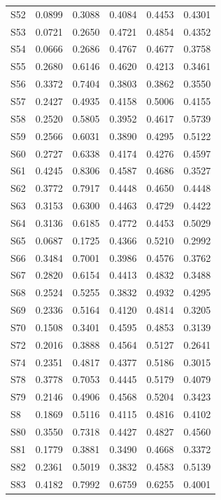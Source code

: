 \begin{longtable}{lrrrrr}
  S52 & 0.0899 & 0.3088 & 0.4084 & 0.4453 & 0.4301 \\
  S53 & 0.0721 & 0.2650 & 0.4721 & 0.4854 & 0.4352 \\
  S54 & 0.0666 & 0.2686 & 0.4767 & 0.4677 & 0.3758 \\
  S55 & 0.2680 & 0.6146 & 0.4620 & 0.4213 & 0.3461 \\
  S56 & 0.3372 & 0.7404 & 0.3803 & 0.3862 & 0.3550 \\
  S57 & 0.2427 & 0.4935 & 0.4158 & 0.5006 & 0.4155 \\
  S58 & 0.2520 & 0.5805 & 0.3952 & 0.4617 & 0.5739 \\
  S59 & 0.2566 & 0.6031 & 0.3890 & 0.4295 & 0.5122 \\
  S60 & 0.2727 & 0.6338 & 0.4174 & 0.4276 & 0.4597 \\
  S61 & 0.4245 & 0.8306 & 0.4587 & 0.4686 & 0.3527 \\
  S62 & 0.3772 & 0.7917 & 0.4448 & 0.4650 & 0.4448 \\
  S63 & 0.3153 & 0.6300 & 0.4463 & 0.4729 & 0.4422 \\
  S64 & 0.3136 & 0.6185 & 0.4772 & 0.4453 & 0.5029 \\
  S65 & 0.0687 & 0.1725 & 0.4366 & 0.5210 & 0.2992 \\
  S66 & 0.3484 & 0.7001 & 0.3986 & 0.4576 & 0.3762 \\
  S67 & 0.2820 & 0.6154 & 0.4413 & 0.4832 & 0.3488 \\
  S68 & 0.2524 & 0.5255 & 0.3832 & 0.4932 & 0.4295 \\
  S69 & 0.2336 & 0.5164 & 0.4120 & 0.4814 & 0.3205 \\
  S70 & 0.1508 & 0.3401 & 0.4595 & 0.4853 & 0.3139 \\
  S72 & 0.2016 & 0.3888 & 0.4564 & 0.5127 & 0.2641 \\
  S74 & 0.2351 & 0.4817 & 0.4377 & 0.5186 & 0.3015 \\
  S78 & 0.3778 & 0.7053 & 0.4445 & 0.5179 & 0.4079 \\
  S79 & 0.2146 & 0.4906 & 0.4568 & 0.5204 & 0.3423 \\
  S8 & 0.1869 & 0.5116 & 0.4115 & 0.4816 & 0.4102 \\
  S80 & 0.3550 & 0.7318 & 0.4427 & 0.4827 & 0.4560 \\
  S81 & 0.1779 & 0.3881 & 0.3490 & 0.4668 & 0.3372 \\
  S82 & 0.2361 & 0.5019 & 0.3832 & 0.4583 & 0.5139 \\
  S83 & 0.4182 & 0.7992 & 0.6759 & 0.6255 & 0.4001 \\

\end{longtable}

